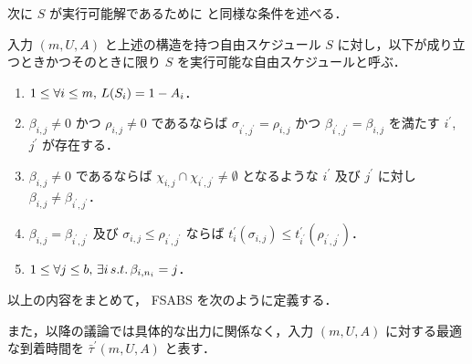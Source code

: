 次に $S$ が実行可能解であるために \textcite{czyzowicz} と同様な条件を述べる．
\begin{definition}\label{definition:fsabs-feasible-schedule}
  入力 $(m, U, A)$ と上述の構造を持つ自由スケジュール $S$ に対し，以下が成り立つときかつそのときに限り $S$ を実行可能な自由スケジュールと呼ぶ．
  \begin{enumerate}
  \item $1 \leq \forall i \leq m,\, L(S_i) = 1 - A_i$．
  \item $\beta_{i,j} \neq 0$ かつ $\rho_{i,j} \neq 0$ であるならば $\sigma_{i^\prime, j^\prime} = \rho_{i,j} \text{ かつ } \beta_{i^\prime, j^\prime} = \beta_{i,j}$ を満たす $i^\prime$, $j^\prime$ が存在する．
  \item $\beta_{i,j} \neq 0$ であるならば $\chi_{i,j} \cap \chi_{i^\prime,j^\prime} \neq \emptyset$ となるような $i^\prime$ 及び $j^\prime$ に対し $\beta_{i,j} \neq \beta_{i^\prime,j ^\prime}$．
  \item $\beta_{i,j} = \beta_{i^\prime, j^\prime}$ 及び $\sigma_{i,j} \leq \rho_{i^\prime, j^{\prime}}$ ならば $t^{\prime}_i(\sigma_{i, j}) \leq t^{\prime}_{i^\prime}(\rho_{i^\prime, j^\prime})$．
  \item $1 \leq \forall j \leq b,\, \exists i \,s.t.\, \beta_{i,n_i} = j$．
  \end{enumerate}
\end{definition}

以上の内容をまとめて， FSABS を次のように定義する．
\begin{problem}
\end{problem}
また，以降の議論では具体的な出力に関係なく，入力 $(m,U, A)$ に対する最適な到着時間を $\bar\tau^\prime(m, U, A)$ と表す．

